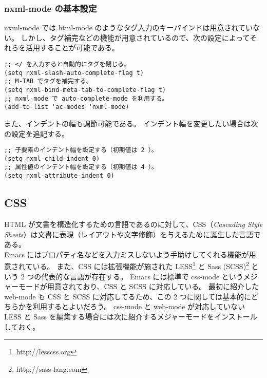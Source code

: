 \subsubsection{nxml-mode の基本設定}
nxml-mode では html-mode のようなタグ入力のキーバインドは用意されていない。
しかし、タグ補完などの機能が用意されているので、次の設定によってそれらを活用することが可能である。
\begin{mdframed}[roundcorner=0.50zw,leftmargin=3.00zw,rightmargin=3.00zw,skipabove=0.40zw,skipbelow=0.40zw,innertopmargin=4.00pt,innerbottommargin=4.00pt,innerleftmargin=5.00pt,innerrightmargin=5.00pt,linecolor=gray!020,linewidth=0.50pt,backgroundcolor=gray!20]
\begin{verbatim}
;; </ を入力すると自動的にタグを閉じる。
(setq nxml-slash-auto-complete-flag t)
;; M-TAB でタグを補完する。
(setq nxml-bind-meta-tab-to-complete-flag t)
;; nxml-mode で auto-complete-mode を利用する。
(add-to-list 'ac-modes 'nxml-mode)
\end{verbatim}
\end{mdframed}
また、インデントの幅も調節可能である。\enlargethispage{0.55zw}
インデント幅を変更したい場合は次の設定を追記する。
\begin{mdframed}[roundcorner=0.50zw,leftmargin=3.00zw,rightmargin=3.00zw,skipabove=0.40zw,skipbelow=0.40zw,innertopmargin=4.00pt,innerbottommargin=4.00pt,innerleftmargin=5.00pt,innerrightmargin=5.00pt,linecolor=gray!020,linewidth=0.50pt,backgroundcolor=gray!20]
\begin{verbatim}
;; 子要素のインデント幅を設定する（初期値は 2 ）。
(setq nxml-child-indent 0)
;; 属性値のインデント幅を設定する（初期値は 4 ）。
(setq nxml-attribute-indent 0)
\end{verbatim}
\end{mdframed}
\subsection{CSS}
HTML が文書を構造化するための言語であるのに対して、CSS（\emph{Cascading Style Sheets}）は文書に表現（レイアウトや文字修飾）を与えるために誕生した言語である。\\

Emacs にはプロパティ名などを入力ミスしないよう手助けしてくれる機能が用意されている。
また、CSS には拡張機能が施された LESS\footnote{http://lesscss.org} と Sass (SCSS)\footnote{http://sass-lang.com} という 2 つの代表的な言語が存在する。
Emacs には標準で css-mode というメジャーモードが用意されており、CSS と SCSS に対応している。
最初に紹介した web-mode も CSS と SCSS に対応してるため、この 2 つに関しては基本的にどちらかを利用するとよいだろう。
css-mode と web-mode が対応していない LESS と Sass を編集する場合には次に紹介するメジャーモードをインストールしておく。
